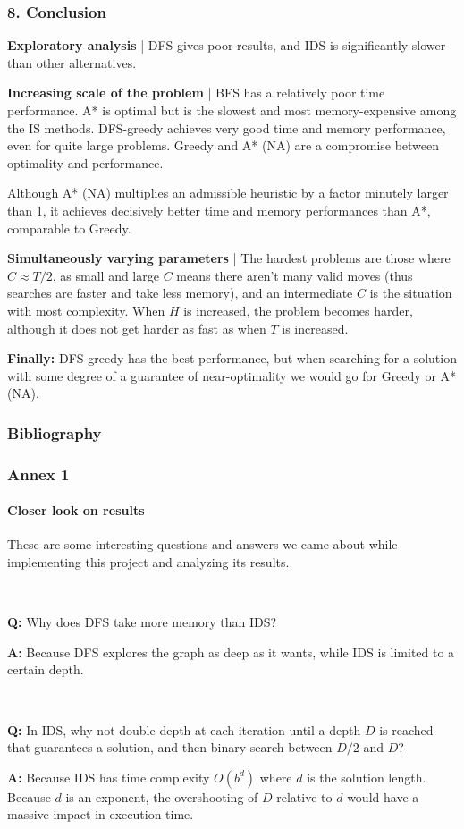 \documentclass{beamer}
\begin{document}
\begin{frame}
\frametitle{8. Conclusion}

\small

\textbf{Exploratory analysis} | DFS gives poor results, and IDS is significantly slower than other alternatives.

\textbf{Increasing scale of the problem} | BFS has a relatively poor time performance. A* is optimal but is the slowest and most memory-expensive among the IS methods. DFS-greedy achieves very good time and memory performance, even for quite large problems. Greedy and A* (NA) are a compromise between optimality and performance.

Although A* (NA) multiplies an admissible heuristic by a factor minutely larger than 1, it achieves decisively better time and memory performances than A*, comparable to Greedy.

\textbf{Simultaneously varying parameters} | The hardest problems are those where $C \approx T/2$, as small and large $C$ means there aren't many valid moves (thus searches are faster and take less memory), and an intermediate $C$ is the situation with most complexity. When $H$ is increased, the problem becomes harder, although it does not get harder as fast as when $T$ is increased.

\textbf{Finally:} DFS-greedy has the best performance, but when searching for a solution with some degree of a guarantee of near-optimality we would go for Greedy or A* (NA).

\end{frame}

\begin{frame}
  \frametitle{Bibliography}
  
  
  
\end{frame}

\begin{frame}
  \frametitle{Annex 1}
  \framesubtitle{Closer look on results}

  These are some interesting questions and answers we came about while implementing this project and analyzing its results.

  ~
  
  \textbf{Q:} Why does DFS take more memory than IDS?
  
  \textbf{A:} Because DFS explores the graph as deep as it wants, while IDS is limited to a certain depth.
  
  ~

  \textbf{Q:} In IDS, why not double depth at each iteration until a depth $D$ is reached that guarantees a solution, and then binary-search between $D/2$ and $D$?

  \textbf{A:} Because IDS has time complexity $O(b^d)$ where $d$ is the solution length. Because $d$ is an exponent, the overshooting of $D$ relative to $d$ would have a massive impact in execution time.

\end{frame}
\end{document}
